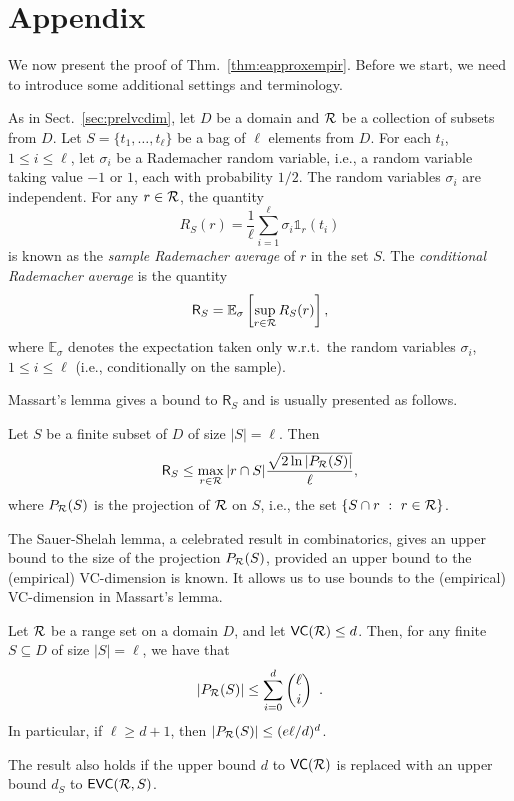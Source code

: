 \appendix
\section{Appendix}
We now present the proof of Thm.~\ref{thm:eapproxempir}. Before we start, we
need to introduce some additional settings and terminology.

As in Sect.~\ref{sec:prelvcdim}, let $D$ be a domain and $\mathcal{R}$ be a
collection of subsets from $D$. Let $S=\{t_1,\dotsc,t_\ell\}$ be a bag of $\ell$
elements from $D$. For each $t_i$, $1\le i\le \ell$, let $\sigma_i$ be a
Rademacher random variable, i.e., a random variable taking value $-1$ or $1$,
each with probability $1/2$. The random variables $\sigma_i$ are independent.
For any $r\in\mathcal{R}$, the quantity
\[
	R_S(r)=\frac{1}{\ell}\sum_{i=1}^\ell \sigma_i\mathds{1}_r(t_i)
\]
is known as the \emph{sample Rademacher average} of $r$ in the set $S$. The
\emph{conditional Rademacher average} is the quantity
\[
	\mathsf{R}_S=\mathbb{E}_\sigma\left[\sup_{r\in\mathcal{R}}R_S(r)\right],
\]
where $\mathbb{E}_\sigma$ denotes the expectation taken only w.r.t.~the random
variables $\sigma_i$, $1\le i\le\ell$ (i.e., conditionally on the sample).

Massart's lemma gives a bound to $\mathsf{R}_S$ and is usually presented as follows.
\begin{lemma}\label{lem:massart}
	Let $S$ be a finite subset of $D$ of size $|S|=\ell$. Then
	\[
		\mathsf{R}_S\le\max_{r\in\mathcal{R}}|r\cap S|\frac{\sqrt{2\ln
		|P_{\mathcal{R}}(S)|}}{\ell},
	\]
	where $P_{\mathcal{R}}(S)$ is the projection of $\mathcal{R}$ on $S$, i.e., the set
	$\{S\cap r ~:~ r\in\mathcal{R}\}$.
\end{lemma}

The Sauer-Shelah lemma, a celebrated result in combinatorics, gives an upper
bound to the size of the projection $P_{\mathcal{R}}(S)$, provided an upper bound to
the (empirical) VC-dimension is known. It allows us to use bounds to the
(empirical) VC-dimension in Massart's lemma.

\begin{lemma}\label{lem:sauer}
	Let $\mathcal{R}$ be a range set on a domain $D$, and let $\mathsf{VC}(\mathcal{R})\le d$.
	Then, for any finite $S\subseteq D$ of size $|S|=\ell$, we have that
	\[
		|P_{\mathcal{R}}(S)|\le \sum_{i=0}^d\binom{\ell}{i}\enspace.
	\]
	In particular, if $\ell\ge d+1$, then $|P_{\mathcal{R}}(S)|\le (e\ell/d)^d$.

	The result also holds if the upper bound $d$ to $\mathsf{VC}(\mathcal{R})$ is replaced with
	an upper bound $d_S$ to $\mathsf{EVC}(\mathcal{R},S)$.
\end{lemma}

